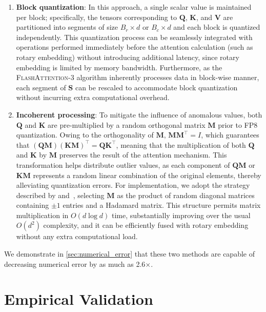 \begin{enumerate}

\item \textbf{Block quantization}: In this approach, a single scalar value is maintained per block; specifically, the tensors corresponding to $\mathbf{Q}$, $\mathbf{K}$, and $\mathbf{V}$ are partitioned into segments of size $B_r \times d$ or $B_c \times d$ and each block is quantized independently. This quantization process can be seamlessly integrated with operations performed immediately before the attention calculation (such as rotary embedding) without introducing additional latency, since rotary embedding is limited by memory bandwidth. Furthermore, as the \textsc{FlashAttention-3} algorithm inherently processes data in block-wise manner, each segment of $\mathbf{S}$ can be rescaled to accommodate block quantization without incurring extra computational overhead.

\item \textbf{Incoherent processing}: To mitigate the influence of anomalous values, both $\mathbf{Q}$ and $\mathbf{K}$ are pre-multiplied by a random orthogonal matrix $\mathbf{M}$ prior to FP8 quantization. Owing to the orthogonality of $\mathbf{M}$, $\mathbf{M} \mathbf{M}^\top = I$, which guarantees that $(\mathbf{Q} \mathbf{M}) (\mathbf{K} \mathbf{M})^\top = \mathbf{Q} \mathbf{K}^\top$, meaning that the multiplication of both $\mathbf{Q}$ and $\mathbf{K}$ by $\mathbf{M}$ preserves the result of the attention mechanism. This transformation helps distribute outlier values, as each component of $\mathbf{Q} \mathbf{M}$ or $\mathbf{K} \mathbf{M}$ represents a random linear combination of the original elements, thereby alleviating quantization errors. For implementation, we adopt the strategy described by \citet{chee2024quip} and~\citet{tseng2024quip}, selecting $\mathbf{M}$ as the product of random diagonal matrices containing $\pm 1$ entries and a Hadamard matrix. This structure permits matrix multiplication in $O(d \log d)$ time, substantially improving over the usual $O(d^2)$ complexity, and it can be efficiently fused with rotary embedding without any extra computational load.

\end{enumerate}

We demonstrate in \cref{sec:numerical_error} that these two methods are capable of decreasing numerical error by as much as 2.6$\times$.

\section{Empirical Validation}
\label{sec:exp}

